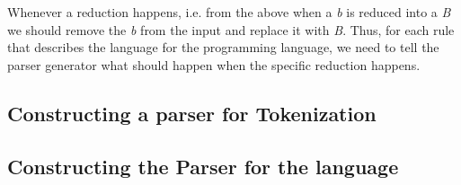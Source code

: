 Whenever a reduction happens, i.e. from the above when a \textit{b} is reduced into a \textit{B} we should remove the \textit{b} from the input and replace it with \textit{B}. Thus, for each rule that describes the language for the programming language, we need to tell the parser generator what should happen when the specific reduction happens.  


\subsection{Constructing a parser for Tokenization}
\subsection{Constructing the Parser for the language}